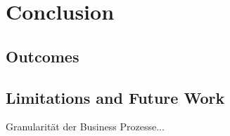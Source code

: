 \chapter{Conclusion}
\label{ch:Conclusion}

\section{Outcomes}

\section{Limitations and Future Work}
Granularität der Business Prozesse...